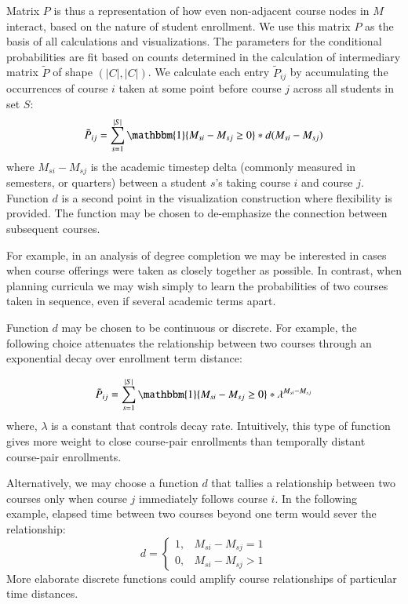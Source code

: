 \documentclass{sigchi}
\begin{document}
Matrix $P$ is thus a representation of how even non-adjacent course nodes in $M$ interact, based on the nature of student enrollment. We use this matrix $P$ as the basis of all calculations and visualizations. 
 The parameters for the conditional probabilities are fit based on counts determined in the calculation of intermediary matrix $\tilde{P}$ of shape $(|C|, |C|)$. We calculate each entry $\tilde{P}_{ij}$ by accumulating the occurrences of course $i$ taken at some point before course $j$ across all students in set $S$:
\begin{equation}
  \tilde{P}_{ij} = \sum_{s=1}^{|S|} \mathbbm{1}\{M_{si} - M_{sj} \geq 0\}* d(M_{si} - M_{sj})
\end{equation}
where $M_{si} - M_{sj}$ is the academic timestep delta (commonly
measured in semesters, or quarters) between a student $s$'s taking
course $i$ and course $j$. Function $d$ is a second point in the
visualization construction where flexibility is provided. The function
may be chosen to de-emphasize the connection between subsequent
courses.

For example, in an analysis of degree completion we may be interested
in cases when course offerings were taken as closely together as
possible. In contrast, when planning curricula we may wish simply to
learn the probabilities of two courses taken in sequence, even if
several academic terms apart.

Function $d$ may be chosen to be continuous or discrete.  For example,
the following choice attenuates the relationship between two courses
through an exponential decay over enrollment term distance:

\begin{equation}
  \tilde{P}_{ij} = \sum_{s=1}^{|S|} \mathbbm{1}\{M_{si} - M_{sj} \geq 0\}* \lambda^{M_{si} - M_{sj}}
\end{equation}
where, $\lambda$ is a constant that controls decay rate. Intuitively, this type of function gives more weight to close course-pair enrollments than temporally distant course-pair enrollments.

Alternatively, we may choose a function $d$ that tallies a
relationship between two courses only when course $j$ immediately
follows course $i$. In the following example, elapsed time between two
courses beyond one term would sever the relationship:
\begin{equation}
d = \begin{cases} 
      1, & M_{si} - M_{sj} = 1 \\
      0, & M_{si} - M_{sj} > 1 
    \end{cases}
\end{equation}
More elaborate discrete functions could amplify course relationships of
particular time distances.
\end{document}
